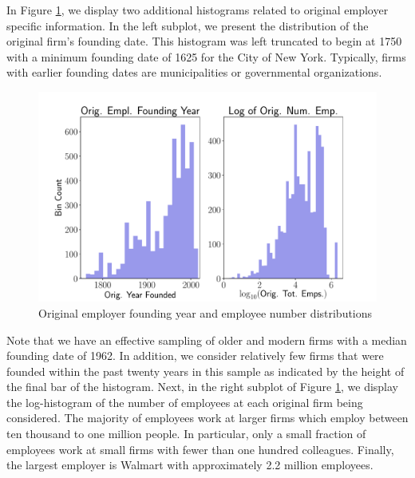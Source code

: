 \documentclass[10pt]{article}
\begin{document}
In Figure \ref{fig:emplstat}, we display two additional histograms related to original 
employer specific information.  In the left subplot, we present the distribution of the 
original firm's founding date.  This histogram was left truncated to begin at 1750 with a minimum 
founding date of 1625 for the City of New York.  Typically, firms with earlier founding 
dates are municipalities or governmental organizations. 
%
\begin{figure}[thb]
    \centering
	\includegraphics[width=1.0\linewidth]{emplstat.pdf}
	\caption{Original employer founding year and employee number distributions}
	\label{fig:emplstat}
\end{figure}
%
Note that we have an effective sampling of older and modern firms with a 
median founding date of 1962.  In addition, we consider relatively few 
firms that were founded within the past twenty years in this sample as 
indicated by the height of the final bar of the histogram.   Next, in 
the right subplot of Figure \ref{fig:emplstat}, we display the log-histogram 
of the number of employees at each original firm being considered. The majority 
of employees work at larger firms which employ between ten thousand to one million 
people.  In particular, only a small fraction of employees work at small 
firms with fewer than one hundred colleagues.  Finally, the largest employer 
is Walmart with approximately 2.2 million employees.
\end{document}
